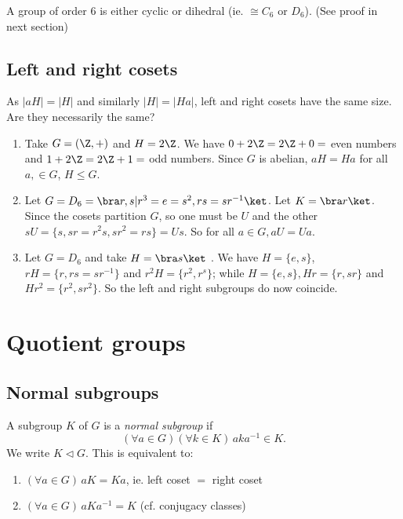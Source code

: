 \documentclass[a4paper]{article}
\begin{document}
\begin{prop}
  A group of order $6$ is either cyclic or dihedral (ie. $\cong C_6$ or $D_6$). (See proof in next section)
\end{prop}

\subsection{Left and right cosets}
As $|aH| = |H|$  and similarly $|H| = |Ha|$, left and right cosets have the same size. Are they necessarily the same?
\begin{eg}\leavevmode
  \begin{enumerate}
    \item Take $G = (\Z, +)$ and $H = 2\Z$. We have $0 + 2\Z = 2\Z + 0 = $ even numbers and $1 + 2\Z = 2\Z + 1 = $ odd numbers. Since $G$ is abelian, $aH = Ha$ for all $a, \in G$, $H\leq G$.
    \item Let $G = D_6 = \bra r, s | r^3 = e = s^2, rs = sr^{-1}\ket$. Let $K = \bra r\ket$. Since the cosets partition $G$, so one must be $U$ and the other $sU = \{s, sr = r^2s, sr^2 = rs\} = Us$. So for all $a\in G, aU = Ua$.
    \item Let $G = D_6$ and take $H = \bra s\ket$ . We have $H = \{e, s\}$, $rH = \{r, rs = sr^{-1}\}$ and $r^2 H = \{r^2, r^s\}$; while $H = \{e, s\}, Hr = \{r, sr\}$ and $Hr^2=\{r^2, sr^2\}$. So the left and right subgroups do now coincide.
  \end{enumerate}
\end{eg}

\section{Quotient groups}
\subsection{Normal subgroups}
\begin{defi}
  A subgroup $K$ of $G$ is a \emph{normal subgroup} if
  \[
    (\forall a\in G)(\forall k\in K)\,aka^{-1}\in K.
  \]
  We write $K\lhd G$. This is equivalent to:
  \begin{enumerate}
    \item $(\forall a\in G)\,aK = Ka$, ie. left coset $=$ right coset
    \item $(\forall a\in G)\,aKa^{-1} = K$ (cf. conjugacy classes)
  \end{enumerate}
\end{defi}
\end{document}
